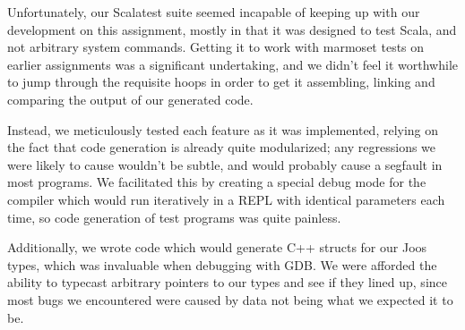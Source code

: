 \documentclass{article}
\begin{document}
Unfortunately, our Scalatest suite seemed incapable of keeping up with our development on this assignment, mostly in
that it was designed to test Scala, and not arbitrary system commands. Getting it to work with marmoset tests on earlier
assignments was a significant undertaking, and we didn't feel it worthwhile to jump through the requisite hoops in order
to get it assembling, linking and comparing the output of our generated code.

Instead, we meticulously tested each feature as it was implemented, relying on the fact that code generation is already
quite modularized; any regressions we were likely to cause wouldn't be subtle, and would probably cause a segfault in
most programs. We facilitated this by creating a special debug mode for the compiler which would run iteratively in a
REPL with identical parameters each time, so code generation of test programs was quite painless.

Additionally, we wrote code which would generate C++ structs for our Joos types, which was invaluable when debugging
with GDB. We were afforded the ability to typecast arbitrary pointers to our types and see if they lined up, since most
bugs we encountered were caused by data not being what we expected it to be.
\end{document}

